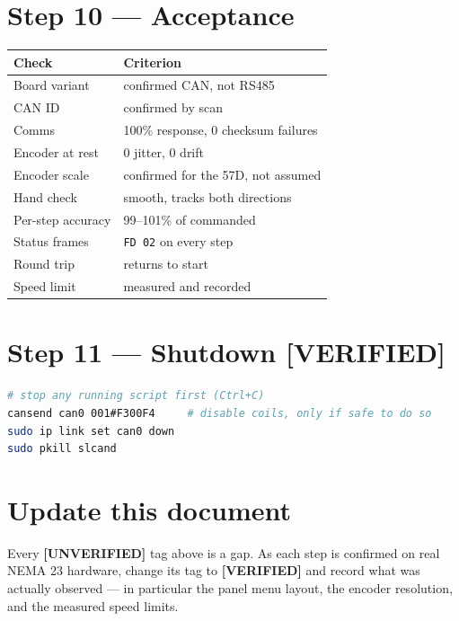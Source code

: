 \documentclass[11pt,letterpaper]{article}
\newcommand{\verified}{{\color{okgreen}\textbf{[VERIFIED]}}}
\newcommand{\unverified}{{\color{unverifiedorange}\textbf{[UNVERIFIED]}}}
\begin{document}
\section*{Step 10 --- Acceptance}
\begin{table}[h]
\centering
\begin{tabular}{ll}
\toprule
\textbf{Check} & \textbf{Criterion} \\ \midrule
Board variant     & confirmed CAN, not RS485 \\
CAN ID            & confirmed by scan \\
Comms             & 100\% response, 0 checksum failures \\
Encoder at rest   & 0 jitter, 0 drift \\
Encoder scale     & confirmed for the 57D, not assumed \\
Hand check        & smooth, tracks both directions \\
Per-step accuracy & 99--101\% of commanded \\
Status frames     & \texttt{FD 02} on every step \\
Round trip        & returns to start \\
Speed limit       & measured and recorded \\
\bottomrule
\end{tabular}
\end{table}

\section*{Step 11 --- Shutdown \verified}
\begin{lstlisting}[language=bash]
# stop any running script first (Ctrl+C)
cansend can0 001#F300F4     # disable coils, only if safe to do so
sudo ip link set can0 down
sudo pkill slcand
\end{lstlisting}

\section*{Update this document}
Every \unverified{} tag above is a gap. As each step is confirmed on real NEMA 23
hardware, change its tag to \verified{} and record what was actually observed --- in
particular the panel menu layout, the encoder resolution, and the measured speed
limits.
\end{document}
